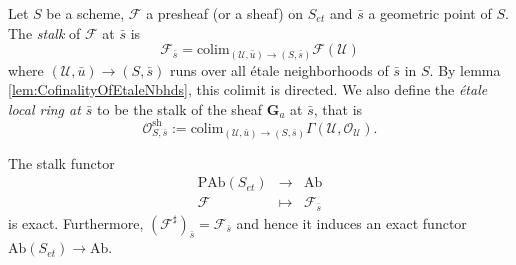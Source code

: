 \begin{definition} \label{defi:EtaleLocalRings}
Let $S$ be a scheme, $\mathcal{F}$ a presheaf (or a sheaf) on $S_{et}$ and $\bar s$ a geometric point of $S$. The \emph{stalk} of $\mathcal{F}$ at $\bar s$ is  
$$
\mathcal{F}_{\bar s} = \text{colim}_{(\mathcal{U}, \bar u) \to (S,\bar s)} \mathcal{F}(\mathcal{U}) 
$$
where $(\mathcal{U}, \bar u) \to (S,\bar s)$ runs over all \'etale neighborhoods of $\bar s$ in $S$. By lemma \ref{lem:CofinalityOfEtaleNbhds}, this colimit is directed. We also define the \emph{\'etale local ring at $\bar s$} to be the stalk of the sheaf $\mathbf{G}_a$ at $\bar s$, that is
$$
\mathcal{O}_{S, \bar{s}}^\text{sh} := \text{colim}_{(\mathcal{U}, \bar u) \to (S,\bar s)} \Gamma(\mathcal{U}, \mathcal{O}_\mathcal{U}).
$$
\end{definition}

\begin{lemma}
The stalk functor 
$$
\begin{array}{rcl}
\text{PAb}(S_{et}) & \longrightarrow & \text{Ab}\\ 
\mathcal{F} & \longmapsto & \mathcal{F}_{\bar s}
\end{array}
$$ 
is exact. Furthermore, $\left(\mathcal{F}^\sharp\right)_{\bar s} = \mathcal{F}_{\bar s}$ and hence it induces an exact functor $\text{Ab}(S_{et})\to \text{Ab}$.
\end{lemma}

